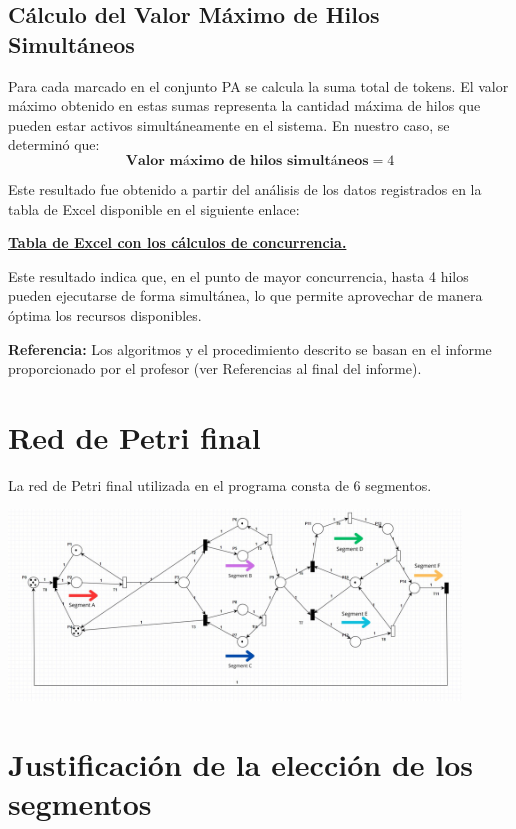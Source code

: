 \documentclass[12pt]{article}
\begin{document}
\subsection{Cálculo del Valor Máximo de Hilos Simultáneos}
Para cada marcado en el conjunto PA se calcula la suma total de tokens. El valor máximo obtenido en estas sumas representa la cantidad máxima de hilos que pueden estar activos simultáneamente en el sistema. En nuestro caso, se determinó que:
\[
\textbf{Valor máximo de hilos simultáneos} = 4
\]

Este resultado fue obtenido a partir del análisis de los datos registrados en la tabla de Excel disponible en el siguiente enlace:

\begin{center}
\textbf{\href{https://docs.google.com/spreadsheets/d/13lKcZztay1l-gB23JhTxPS3u15EKYW5BMGamDRmy2Xo/edit?hl=es\&gid=0}{Tabla de Excel con los cálculos de concurrencia.}}
\end{center}

Este resultado indica que, en el punto de mayor concurrencia, hasta 4 hilos pueden ejecutarse de forma simultánea, lo que permite aprovechar de manera óptima los recursos disponibles.

\vspace{1em}
\textbf{Referencia:} Los algoritmos y el procedimiento descrito se basan en el informe proporcionado por el profesor (ver Referencias al final del informe).

\newpage

\section{Red de Petri final}

La red de Petri final utilizada en el programa consta de 6 segmentos.
\begin{center}
    \includegraphics[width=0.9\textwidth]{Petri-Net-Final.jpeg}
\end{center}

\section{Justificación de la elección de los segmentos}
\end{document}
